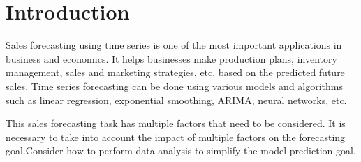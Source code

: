 \section{Introduction}\label{sec-intro}











{}
Sales forecasting using time series is one of the most important applications in business and economics. It helps businesses make production plans, inventory management, sales and marketing strategies, etc. based on the predicted future sales. Time series forecasting can be done using various models and algorithms such as linear regression, exponential smoothing, ARIMA, neural networks, etc. 


{}
This sales forecasting task has multiple factors that need to be considered. It is necessary to take into account the impact of multiple factors on the forecasting goal.Consider how to perform data analysis to simplify the model prediction goal.

